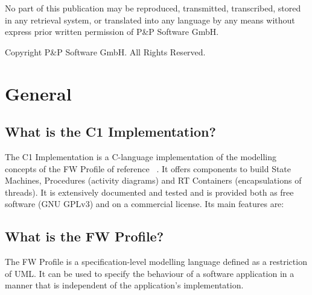 \documentclass[a4paper,10pt]{article}
\let\stdsection\section
\renewcommand\section{\newpage\stdsection}
\begin{document}
\newpage
\vspace*{\fill}
\begin{center}
No part of this publication may be reproduced, transmitted, transcribed, stored in any retrieval system, or translated into any language
by any means without express prior written permission of P\&P Software GmbH.
\end{center}

\begin{center}
Copyright  P\&P Software GmbH. All Rights Reserved. 
\end{center}
\vspace*{\fill}

\newpage

\tableofcontents
\newpage

\setlength{\parskip}{3mm}						%


\section{General}
\subsection{What is the C1 Implementation?}
The C1 Implementation is a C-language implementation of the modelling concepts of the FW Profile of reference ~\cite{ref:fwprofile}. It offers components to build State Machines, Procedures (activity diagrams) and RT Containers (encapsulations of threads). It is extensively documented and tested and is provided both as free software (GNU GPLv3) and on a commercial license. Its main features are:



\subsection{What is the FW Profile?}\label{faq:FW_Profile}
The FW Profile is a specification-level modelling language defined as a restriction of UML. It can be used to specify the behaviour of a software application in a manner that is independent of the application's implementation.
\end{document}
